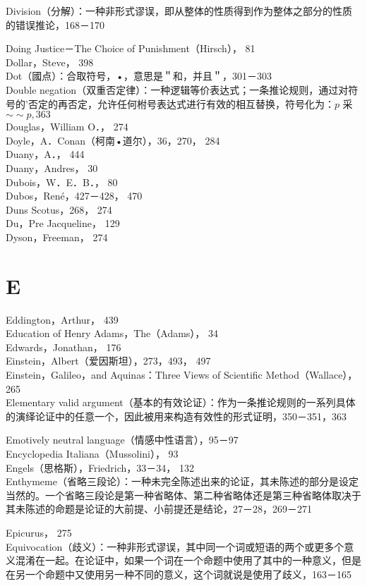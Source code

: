 Division（分解）：一种非形式谬误，即从整体的性质得到作为整体之部分的性质的错误推论，168－170

Doing Justice－The Choice of Punishment（Hirsch）， 81\\
Dollar，Steve， 398\\
Dot（國点）：合取符号，•，意思是＂和，并且＂，301－303\\
Double negation（双重否定律）：一种逻辑等价表达式；一条推论规则，通过对符号的’否定的再否定，允许任何柎号表达式进行有效的相互替换，符号化为：$p$ 采 $\sim \sim p, 363$\\
Douglas，William O．， 274\\
Doyle，A．Conan（柯南•道尔），36，270， 284\\
Duany，A．， 444\\
Duany，Andres， 30\\
Dubois，W．E．B．， 80\\
Dubos，René，427－428， 470\\
Duns Scotus，268， 274\\
Du，Pre Jacqueline， 129\\
Dyson，Freeman， 274

\section*{E}
Eddington，Arthur， 439\\
Education of Henry Adams，The（Adams）， 34\\
Edwards，Jonathan， 176\\
Einstein，Albert（爱因斯坦），273，493， 497\\
Einstein，Galileo，and Aquinas：Three Views of Scientific Method（Wallace）， 265\\
Elementary valid argument（基本的有效论证）：作为一条推论规则的一系列具体的演绎论证中的任意一个，因此被用来构造有效性的形式证明，350－351，363

Emotively neutral language（情感中性语言），95－97\\
Encyclopedia Italiana（Mussolini）， 93\\
Engels（思格斯），Friedrich，33－34， 132\\
Enthymeme（省略三段论）：一种未完全陈述出来的论证，其未陈述的部分是设定当然的。一个省略三段论是第一种省略体、第二种省略体还是第三种省略体取决于其未陈述的命题是论证的大前提、小前提还是结论，27－28，269－271

Epicurus， 275\\
Equivocation（歧义）：一种非形式谬误，其中同一个词或短语的两个或更多个意义混淆在一起。在论证中，如果一个词在一个命题中使用了其中的一种意义，但是在另一个命题中又使用另一种不同的意义，这个词就说是使用了歧义，163－165

